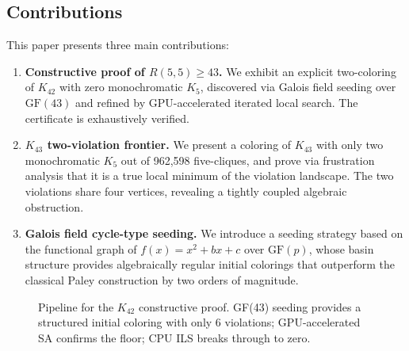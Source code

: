 \documentclass[11pt,a4paper]{article}
\theoremstyle{plain}
\theoremstyle{remark}
\newcommand{\GF}{\mathrm{GF}}
\begin{document}
\subsection{Contributions}

This paper presents three main contributions:

\begin{enumerate}[leftmargin=2em]
  \item \textbf{Constructive proof of $R(5,5) \geq 43$.}
    We exhibit an explicit two-coloring of $K_{42}$ with zero
    monochromatic $K_5$, discovered via Galois field seeding over
    $\GF(43)$ and refined by GPU-accelerated iterated local search.
    The certificate is exhaustively verified.

  \item \textbf{$K_{43}$ two-violation frontier.}
    We present a coloring of $K_{43}$ with only two monochromatic
    $K_5$ out of 962{,}598 five-cliques, and prove via frustration
    analysis that it is a true local minimum of the violation landscape.
    The two violations share four vertices, revealing a tightly
    coupled algebraic obstruction.

  \item \textbf{Galois field cycle-type seeding.}
    We introduce a seeding strategy based on the functional graph of
    $f(x) = x^2 + bx + c$ over $\GF(p)$, whose basin structure
    provides algebraically regular initial colorings that outperform
    the classical Paley construction by two orders of magnitude.
\end{enumerate}

\begin{figure}[H]
\centering
{}
\caption{Pipeline for the $K_{42}$ constructive proof.
  GF(43) seeding provides a structured initial coloring with only 6
  violations; GPU-accelerated SA confirms the floor; CPU ILS breaks
  through to zero.}
\label{fig:pipeline-k42}
\end{figure}
\end{document}
